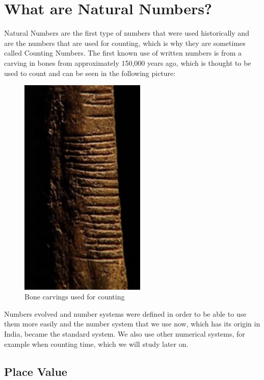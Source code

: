 \documentclass[11pt, oneside]{article}
\theoremstyle{definition}
\begin{document}
\section{What are Natural Numbers?}

Natural Numbers are the first type of numbers that were used historically and are the numbers that are used for counting, which is why they are sometimes called Counting Numbers. The first known use of written numbers is from a carving in bones from approximately 150,000 years ago, which is thought to be used to count and can be seen in the following picture:

\begin{figure}[ht!]
\centering
\includegraphics[width=60mm]{bone-carving.jpg}
\caption{Bone carvings used for counting \label{overflow}}
\end{figure}

Numbers evolved and number systems were defined in order to be able to use them more easily and the number system that we use now, which has its origin in India, became the standard system. We also use other numerical systems, for example when counting time, which we will study later on. 

\subsection{Place Value}
\end{document}
